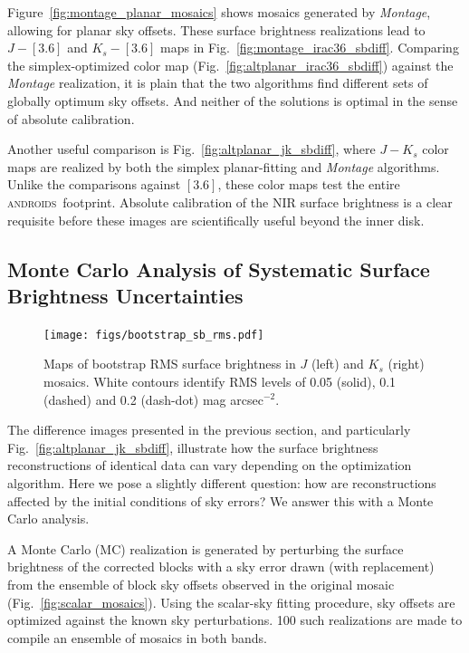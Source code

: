 \documentclass[iop]{emulateapj}
\newcommand{\sw}[1]{\textit{#1}} %
\newcommand{\androids}{\textsc{androids}}
\newcommand{\Fig}[1]{Fig.~\ref{fig:#1}}  %
\begin{document}
Figure~\ref{fig:montage_planar_mosaics} shows mosaics generated by \sw{Montage}, allowing for planar sky offsets.
These surface brightness realizations lead to $J-[3.6]$ and $K_s-[3.6]$ maps in \Fig{montage_irac36_sbdiff}.
Comparing the simplex-optimized color map (\Fig{altplanar_irac36_sbdiff}) against the \sw{Montage} realization, it is plain that the two algorithms find different sets of globally optimum sky offsets.
And neither of the solutions is optimal in the sense of absolute calibration.

Another useful comparison is \Fig{altplanar_jk_sbdiff}, where $J-K_s$ color maps are realized by both the simplex planar-fitting and \sw{Montage} algorithms.
Unlike the comparisons against $[3.6]$, these color maps test the entire \androids\ footprint.
Absolute calibration of the NIR surface brightness is a clear requisite before these images are scientifically useful beyond the inner disk.

\subsection{Monte Carlo Analysis of Systematic Surface Brightness Uncertainties}

\begin{figure}[t]
\centering
\texttt{[image: figs/bootstrap\_sb\_rms.pdf]}
\caption{Maps of bootstrap RMS surface brightness in $J$ (left) and $K_s$ (right) mosaics.
White contours identify RMS levels of 0.05 (solid), 0.1 (dashed) and 0.2 (dash-dot) mag arcsec$^{-2}$.}
\label{fig:bootstrap_sb_rms}
\end{figure}

The difference images presented in the previous section, and particularly \Fig{altplanar_jk_sbdiff}, illustrate how the surface brightness reconstructions of identical data can vary depending on the optimization algorithm.
Here we pose a slightly different question: how are reconstructions affected by the initial conditions of sky errors? We answer this with a Monte Carlo analysis.

A Monte Carlo (MC) realization is generated by perturbing the surface brightness of the corrected blocks with a sky error drawn (with replacement) from the ensemble of block sky offsets observed in the original mosaic (\Fig{scalar_mosaics}).
Using the scalar-sky fitting procedure, sky offsets  are optimized against the known sky perturbations.
100 such realizations are made to compile an ensemble of mosaics in both bands.
\end{document}
